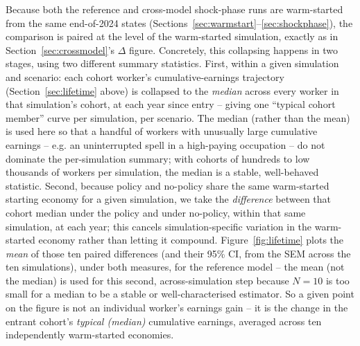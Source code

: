 \documentclass{article}
\begin{document}
Because both the reference and cross-model shock-phase runs are warm-started from the same
end-of-2024 states (Sections~\ref{sec:warmstart}--\ref{sec:shockphase}), the comparison is paired at
the level of the warm-started simulation, exactly as in Section~\ref{sec:crossmodel}'s $\Delta$ figure.
Concretely, this collapsing happens in two stages, using two different summary statistics. First,
within a given simulation and scenario: each cohort worker's cumulative-earnings trajectory
(Section~\ref{sec:lifetime} above) is collapsed to the \emph{median} across every worker in that
simulation's cohort, at each year since entry -- giving one ``typical cohort member'' curve per
simulation, per scenario. The median (rather than the mean) is used here so that a handful of workers
with unusually large cumulative earnings -- e.g. an uninterrupted spell in a high-paying occupation --
do not dominate the per-simulation summary; with cohorts of hundreds to low thousands of workers per
simulation, the median is a stable, well-behaved statistic. Second, because policy and no-policy share
the same warm-started starting economy for a given simulation, we take the \emph{difference} between
that cohort median under the policy and under no-policy, within that same simulation, at each year;
this cancels simulation-specific variation in the warm-started economy rather than letting it compound.
Figure~\ref{fig:lifetime} plots the \emph{mean} of those ten paired differences (and their 95\% CI, from
the SEM across the ten simulations), under both measures, for the reference model -- the mean (not the
median) is used for this second, across-simulation step because $N=10$ is too small for a median to be
a stable or well-characterised estimator. So a given point on the figure is not an individual worker's
earnings gain -- it is the change in the entrant cohort's \emph{typical (median)} cumulative earnings,
averaged across ten independently warm-started economies.

\end{document}
